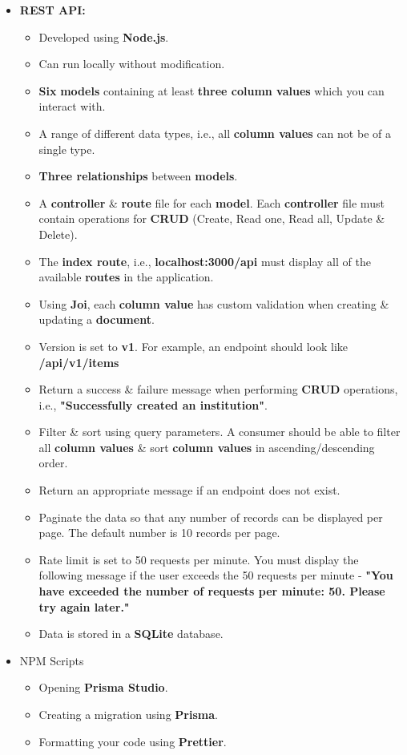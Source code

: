 \documentclass{article}
\begin{document}
\begin{itemize} 
	\item \textbf{REST API:}
	\begin{itemize}
	\item Developed using \textbf{Node.js}.
	\item Can run locally without modification.
	\item \textbf{Six} \textbf{models} containing at least \textbf{three column values} which you can interact with.
	\item A range of different data types, i.e., all \textbf{column values} can not be of a single type.
	\item \textbf{Three relationships} between \textbf{models}.
	\item A \textbf{controller} \& \textbf{route} file for each \textbf{model}. Each \textbf{controller} file must contain operations for \textbf{CRUD} (Create, Read one, Read all, Update \& Delete).
	\item The \textbf{index route}, i.e., \textbf{localhost:3000/api} must display all of the available \textbf{routes} in the application.
	\item Using \textbf{Joi}, each \textbf{column value} has custom validation when creating \& updating a \textbf{document}.
	\item Version is set to \textbf{v1}. For example, an endpoint should look like \textbf{/api/v1/items}
	\item Return a success \& failure message when performing \textbf{CRUD} operations, i.e., \textbf{"Successfully created an institution"}.
	\item Filter \& sort using query parameters. A consumer should be able to filter all \textbf{column values} \& sort \textbf{column values} in ascending/descending order.
	\item Return an appropriate message if an endpoint does not exist.
	\item Paginate the data so that any number of records can be displayed per page. The default number is 10 records per page. 
	\item Rate limit is set to 50 requests per minute. You must display the following message if the user exceeds the 50 requests per minute - \textbf{"You have exceeded the number of requests per minute: 50. Please try again later."}
	\item Data is stored in a \textbf{SQLite} database.
\end{itemize}
\item NPM Scripts
\begin{itemize}
	\item Opening \textbf{Prisma Studio}.
	\item Creating a migration using \textbf{Prisma}. 
	\item Formatting your code using \textbf{Prettier}.
\end{itemize}
\end{itemize}
\end{document}
